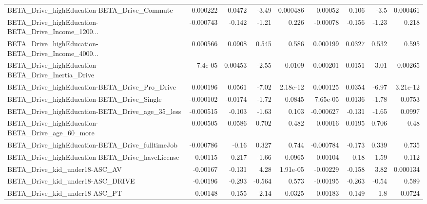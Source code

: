 \begin{tabular}{lrrrrrrrr}
BETA\_Drive\_highEducation-BETA\_Drive\_Commute        &    0.000222 &       0.0472 &    -3.49 & 0.000486 &    0.00052 &       0.106 &         -3.5 &      0.000461 \\
BETA\_Drive\_highEducation-BETA\_Drive\_Income\_1200... &   -0.000743 &       -0.142 &    -1.21 &    0.226 &   -0.00078 &      -0.156 &        -1.23 &         0.218 \\
BETA\_Drive\_highEducation-BETA\_Drive\_Income\_4000... &    0.000566 &       0.0908 &    0.545 &    0.586 &   0.000199 &      0.0327 &        0.532 &         0.595 \\
BETA\_Drive\_highEducation-BETA\_Drive\_Inertia\_Drive  &     7.4e-05 &      0.00453 &    -2.55 &   0.0109 &   0.000201 &      0.0151 &        -3.01 &       0.00265 \\
BETA\_Drive\_highEducation-BETA\_Drive\_Pro\_Drive      &    0.000196 &       0.0561 &    -7.02 & 2.18e-12 &   0.000125 &      0.0354 &        -6.97 &      3.21e-12 \\
BETA\_Drive\_highEducation-BETA\_Drive\_Single         &   -0.000102 &      -0.0174 &    -1.72 &   0.0845 &   7.65e-05 &      0.0136 &        -1.78 &        0.0753 \\
BETA\_Drive\_highEducation-BETA\_Drive\_age\_35\_less    &   -0.000515 &       -0.103 &    -1.63 &    0.103 &  -0.000627 &      -0.131 &        -1.65 &        0.0997 \\
BETA\_Drive\_highEducation-BETA\_Drive\_age\_60\_more    &    0.000505 &       0.0586 &    0.702 &    0.482 &    0.00016 &      0.0195 &        0.706 &          0.48 \\
BETA\_Drive\_highEducation-BETA\_Drive\_fulltimeJob    &   -0.000786 &        -0.16 &    0.327 &    0.744 &  -0.000784 &      -0.173 &        0.339 &         0.735 \\
BETA\_Drive\_highEducation-BETA\_Drive\_haveLicense    &    -0.00115 &       -0.217 &    -1.66 &   0.0965 &   -0.00104 &       -0.18 &        -1.59 &         0.112 \\
BETA\_Drive\_kid\_under18-ASC\_AV                      &    -0.00167 &       -0.131 &     4.28 & 1.91e-05 &   -0.00229 &      -0.158 &         3.82 &      0.000134 \\
BETA\_Drive\_kid\_under18-ASC\_DRIVE                   &    -0.00196 &       -0.293 &   -0.564 &    0.573 &   -0.00195 &      -0.263 &        -0.54 &         0.589 \\
BETA\_Drive\_kid\_under18-ASC\_PT                      &    -0.00148 &       -0.155 &    -2.14 &   0.0325 &   -0.00183 &      -0.149 &         -1.8 &        0.0724 \\

\end{tabular}
